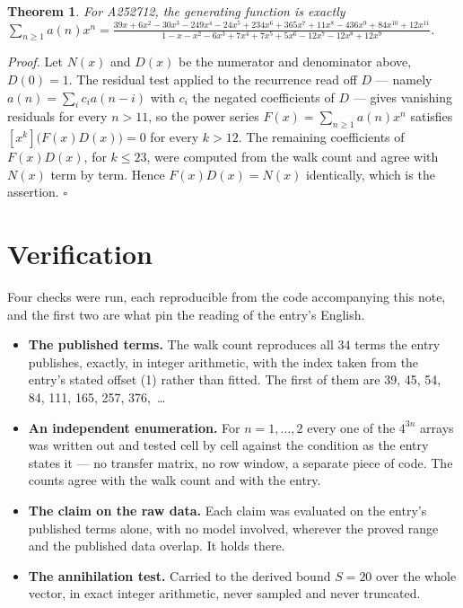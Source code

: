 \documentclass[11pt]{article}
\newtheorem{theorem}{Theorem}
\theoremstyle{definition}
\begin{document}
\begin{theorem} For A252712, the generating function is exactly $\sum_{n\ge 1} a(n)x^n = \frac{39x + 6x^{2} - 30x^{3} - 249x^{4} - 24x^{5} + 234x^{6} + 365x^{7} + 11x^{8} - 436x^{9} + 84x^{10} + 12x^{11}}{1 - x - x^{2} - 6x^{3} + 7x^{4} + 7x^{5} + 5x^{6} - 12x^{7} - 12x^{8} + 12x^{9}}$.\end{theorem}

{\itshape Proof.} Let $N(x)$ and $D(x)$ be the numerator and denominator above, $D(0)=1$. The residual test applied to the recurrence read off $D$ --- namely $a(n) = \sum_i c_i a(n-i)$ with $c_i$ the negated coefficients of $D$ --- gives vanishing residuals for every $n > 11$, so the power series $F(x)=\sum_{n\ge 1}a(n)x^n$ satisfies $[x^k]\bigl(F(x)D(x)\bigr) = 0$ for every $k > 12$. The remaining coefficients of $F(x)D(x)$, for $k \le 23$, were computed from the walk count and agree with $N(x)$ term by term. Hence $F(x)D(x) = N(x)$ identically, which is the assertion. $\square$

\section{Verification}

Four checks were run, each reproducible from the code accompanying this note, and the first two are what pin the reading of the entry's English.

\begin{itemize}

\item {\bfseries The published terms.} The walk count reproduces all 34 terms the entry publishes, exactly, in integer arithmetic, with the index taken from the entry's stated offset (1) rather than fitted. The first of them are 39, 45, 54, 84, 111, 165, 257, 376,~\dots

\item {\bfseries An independent enumeration.} For $n = 1,\dots,2$ every one of the $4^{3n}$ arrays was written out and tested cell by cell against the condition as the entry states it --- no transfer matrix, no row window, a separate piece of code. The counts agree with the walk count and with the entry.

\item {\bfseries The claim on the raw data.} Each claim was evaluated on the entry's published terms alone, with no model involved, wherever the proved range and the published data overlap. It holds there.

\item {\bfseries The annihilation test.} Carried to the derived bound $S = 20$ over the whole vector, in exact integer arithmetic, never sampled and never truncated.

\end{itemize}
\end{document}
